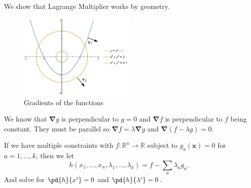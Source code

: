 We show that Lagrange Multiplier works by geometry.
\begin{figure}[htpb]
    \centering
    \includegraphics[width=0.5\textwidth]{Figures/fig_1_3.pdf}
    \caption{Gradients of the functions}
    \label{fig:fig_1_3}
\end{figure}

We know that \(\boldsymbol{\nabla}g\) is perpendicular to \(g = 0\) and \(\boldsymbol{\nabla}f\) is perpendicular to \(f\) being constant. They must be parallel so \(\boldsymbol{\nabla}f = \lambda \boldsymbol{\nabla} g\) and \(\boldsymbol{\nabla}(f - \lambda g) = 0\).

If we have multiple constraints with \(f: \mathbb{R}^n \to \mathbb{R}\) subject to \(g_a(\mathbf{x}) = 0\) for \(a = 1, \dots, k\), then we let
\[
    h(x_1, \dots, x_n, \lambda_1, \dots, \lambda_k) = f - \sum_a \lambda_a g_a.
\]
And solve for \(\pd{h}{x^i} = 0\) and \(\pd{h}{\lambda^i} = 0\).
